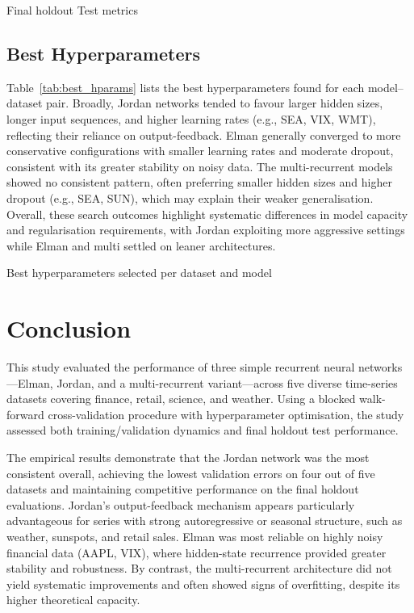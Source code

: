 \documentclass[conference]{IEEEtran}
\begin{document}
\begin{table}[h]
    \centering
    \caption{Final holdout Test metrics}
    \label{tab:final_holdout_test_metrics}
    \resizebox{1.02\columnwidth}{!}{%
        
    }
\end{table}

\subsection{Best Hyperparameters}
Table~\ref{tab:best_hparams} lists the best hyperparameters found for each model–dataset pair. Broadly, Jordan networks tended to favour larger hidden sizes, longer input sequences, and higher learning rates (e.g., SEA, VIX, WMT), reflecting their reliance on output-feedback. Elman generally converged to more conservative configurations with smaller learning rates and moderate dropout, consistent with its greater stability on noisy data. The multi-recurrent models showed no consistent pattern, often preferring smaller hidden sizes and higher dropout (e.g., SEA, SUN), which may explain their weaker generalisation. Overall, these search outcomes highlight systematic differences in model capacity and regularisation requirements, with Jordan exploiting more aggressive settings while Elman and multi settled on leaner architectures.


\begin{table}[h]
    \centering
    \caption{Best hyperparameters selected per dataset and model}
    \label{tab:best_hparams}
    \resizebox{1.02\columnwidth}{!}{%
        
    }
\end{table}

\section{Conclusion}

This study evaluated the performance of three simple recurrent neural networks---Elman, Jordan, and a multi-recurrent variant---across five diverse time-series datasets covering finance, retail, science, and weather. Using a blocked walk-forward cross-validation procedure with hyperparameter optimisation, the study assessed both training/validation dynamics and final holdout test performance.

The empirical results demonstrate that the Jordan network was the most consistent overall, achieving the lowest validation errors on four out of five datasets and maintaining competitive performance on the final holdout evaluations. Jordan’s output-feedback mechanism appears particularly advantageous for series with strong autoregressive or seasonal structure, such as weather, sunspots, and retail sales. Elman was most reliable on highly noisy financial data (AAPL, VIX), where hidden-state recurrence provided greater stability and robustness. By contrast, the multi-recurrent architecture did not yield systematic improvements and often showed signs of overfitting, despite its higher theoretical capacity.
\end{document}
